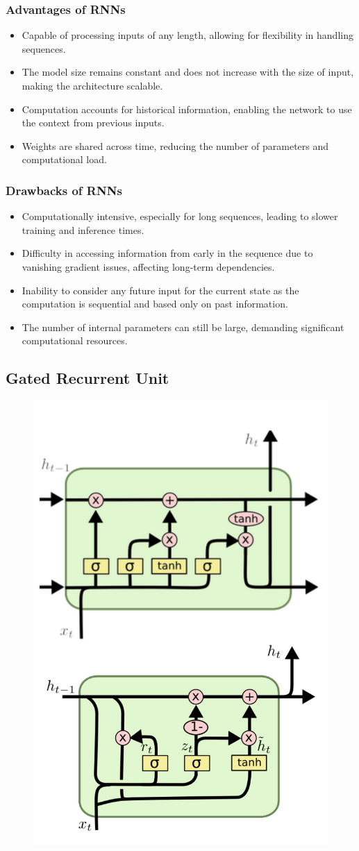 \subsubsection*{Advantages of RNNs}
\begin{itemize}
    \item Capable of processing inputs of any length, allowing for flexibility in handling sequences.
    \item The model size remains constant and does not increase with the size of input, making the architecture scalable.
    \item Computation accounts for historical information, enabling the network to use the context from previous inputs.
    \item Weights are shared across time, reducing the number of parameters and computational load.
\end{itemize}

\subsubsection*{Drawbacks of RNNs}
\begin{itemize}
    \item Computationally intensive, especially for long sequences, leading to slower training and inference times.
    \item Difficulty in accessing information from early in the sequence due to vanishing gradient issues, affecting long-term dependencies.
    \item Inability to consider any future input for the current state as the computation is sequential and based only on past information.
    \item The number of internal parameters can still be large, demanding significant computational resources.
\end{itemize}

\subsection{Gated Recurrent Unit}
\begin{figure}[H]
    \centering
    \includegraphics[width=0.4\linewidth]{img/GRU.png}
    
\end{figure}

